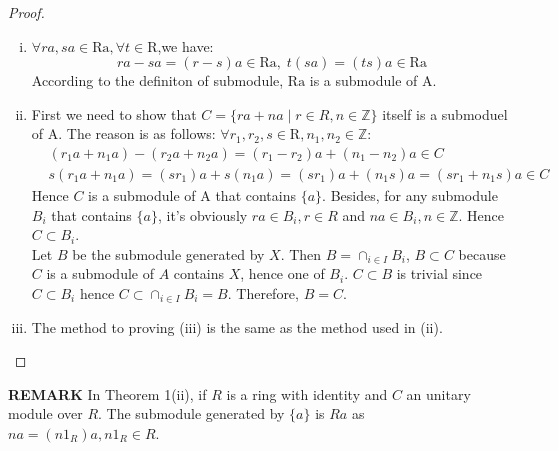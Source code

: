 \documentclass[a4paper]{article}
\newcommand{\Z}{\mathbb{Z}}
\begin{document}
    \begin{proof}
        \begin{enumerate}[(i)]
            \item $\forall ra,sa\in \mathrm{Ra},\forall t\in\mathrm{R}$,we have:
            $$
            ra-sa=(r-s)a\in \mathrm{Ra},\;t(sa)=(ts)a\in \mathrm{Ra}
            $$
            According to the definiton of submodule, $\mathrm{Ra}$ is a submodule of A.
            \item First we need to show that $C=\{ra+na\;|\;r\in R, n\in \Z\}$ itself is a submoduel of A. The reason is as follows: $\forall r_1,r_2,s\in \mathrm{R},n_1,n_2\in \Z$:
            $$
            \begin{aligned}
            &(r_1a+n_1a)-(r_2a+n_2a)=(r_1-r_2)a+(n_1-n_2)a\in C\\
            &s(r_1a+n_1a)=(sr_1)a+s(n_1a)=(sr_1)a+(n_1s)a=(sr_1+n_1s)a\in C
            \end{aligned}
            $$ 
            Hence $C$ is a submodule of $\mathrm{A}$ that contains $\{a\}$. Besides, for any submodule $B_i$ that contains $\{a\}$, it's obviously $ra\in B_i,r\in R$ and $na\in B_i,n\in \Z$. Hence $C\subset B_i$.\\
            Let $B$ be the submodule generated by $X$. Then $B=\cap_{i\in I}B_i$, $B\subset C$ because $C$ is a submodule of $A$ contains $X$, hence one of $B_i$. $C\subset B$ is trivial since $C\subset B_i$ hence $C\subset \cap_{i\in I} B_i=B$. Therefore, $B=C$. 
            
            \item The method to proving (iii) is the same as the method used in (ii).
        \end{enumerate}
    \end{proof}
    \noindent
    \textbf{REMARK} In Theorem 1(ii), if $R$ is a ring with identity and $C$ an unitary module over $R$. The submodule generated by $\{a\}$ is $Ra$ as $na=(n1_R)a,n1_R\in R$.
    \vspace{0.5cm}
\end{document}

